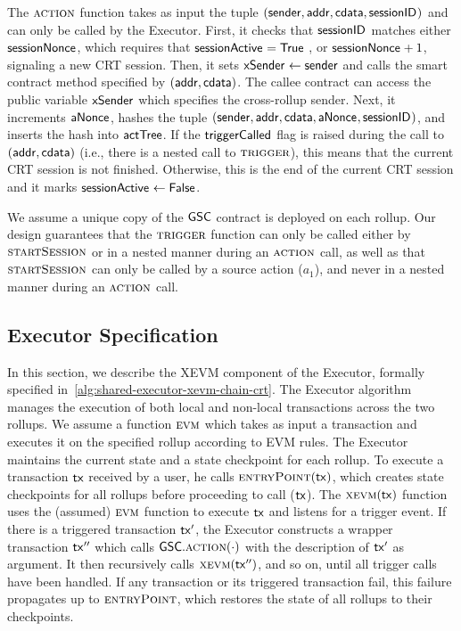 The $\action$ function takes as input the tuple $(\mathsf{sender}, \mathsf{addr}{}, \mathsf{cdata}, \mathsf{sessionID_{}})$ and can only be called by the Executor. First, it checks that $\mathsf{sessionID_{}}$ matches either $\mathsf{sessionNonce_{}}$, which requires that $\mathsf{sessionActive_{}} = \mathsf{True}$ , or $\mathsf{sessionNonce_{}} + 1$, signaling a new CRT session. Then, it sets $\mathsf{xSender_{}} \gets \mathsf{sender}$ and calls the smart contract method specified by $(\mathsf{addr}{}, \mathsf{cdata})$. The callee contract can access the public variable $\mathsf{xSender_{}}$ which specifies the cross-rollup sender. Next, it increments $\mathsf{aNonce_{}}$, hashes the tuple $(\mathsf{sender}, \mathsf{addr}{}, \mathsf{cdata}, \mathsf{aNonce_{}}, \mathsf{sessionID_{}})$, and inserts the hash into $\mathsf{actTree}$. If the $\mathsf{triggerCalled_{}}$ flag is raised during the call to $(\mathsf{addr}{}, \mathsf{cdata})$ (i.e., there is a nested call to $\trigger$), this means that the current CRT session is not finished. Otherwise, this is the end of the current CRT session and it marks $\mathsf{sessionActive_{}} \gets \mathsf{False}$. 



We assume a unique copy of the $\mathsf{GSC}$ contract is deployed on each rollup. Our design guarantees that the $\trigger$ function can only be called either by $\startsession$ or in a nested manner during an $\action$ call, as well as that $\startsession$ can only be called by a source action ($a_1$), and never in a nested manner during an $\action$ call.


\subsection{Executor Specification}
 

In this section, we describe the XEVM component of the Executor, formally specified in~\cref{alg:shared-executor-xevm-chain-crt}. The Executor algorithm manages the execution of both local and non-local transactions across the two rollups. We assume a function $\textproc{evm}$ which takes as input a transaction and executes it on the specified rollup according to EVM rules. The Executor maintains the current state and a state checkpoint for each rollup. To execute a transaction $\mathsf{tx}$ received by a user, he calls $\textproc{entryPoint}(\tx)$, which creates state checkpoints for all rollups before proceeding to call ($\mathsf{tx}$). The $\textproc{xevm}(\tx)$ function uses the (assumed) $\textproc{evm}$ function to execute $\mathsf{tx}$ and listens for a trigger event. If there is a triggered transaction $\mathsf{tx}'$, the Executor constructs a wrapper transaction $\mathsf{tx}''$ which calls $\gsc.\action(\cdot)$ with the description of $\mathsf{tx}'$ as argument. It then recursively calls $\textproc{xevm}(\tx'')$, and so on, until all trigger calls have been handled. If any transaction or its triggered transaction fail, this failure propagates up to $\textproc{entryPoint} $, which restores the state of all rollups to their checkpoints.
























